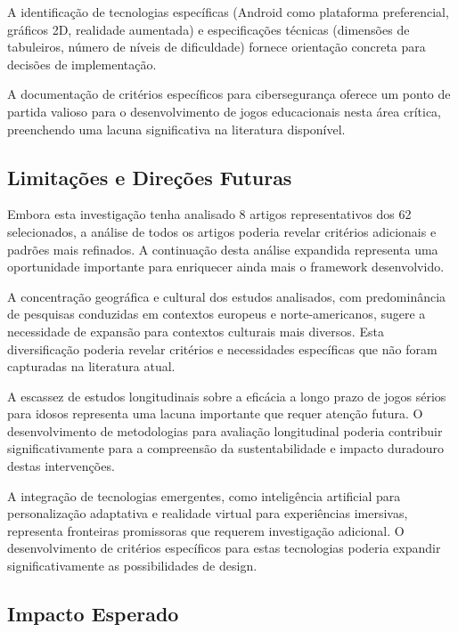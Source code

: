 \begin{table}[H]
A identificação de tecnologias específicas (Android como plataforma preferencial, gráficos 2D, realidade aumentada) e especificações técnicas (dimensões de tabuleiros, número de níveis de dificuldade) fornece orientação concreta para decisões de implementação.

A documentação de critérios específicos para cibersegurança oferece um ponto de partida valioso para o desenvolvimento de jogos educacionais nesta área crítica, preenchendo uma lacuna significativa na literatura disponível.

\subsection{Limitações e Direções Futuras}
\label{subsec:limitacoes_direções}

Embora esta investigação tenha analisado 8 artigos representativos dos 62 selecionados, a análise de todos os artigos poderia revelar critérios adicionais e padrões mais refinados. A continuação desta análise expandida representa uma oportunidade importante para enriquecer ainda mais o framework desenvolvido.

A concentração geográfica e cultural dos estudos analisados, com predominância de pesquisas conduzidas em contextos europeus e norte-americanos, sugere a necessidade de expansão para contextos culturais mais diversos. Esta diversificação poderia revelar critérios e necessidades específicas que não foram capturadas na literatura atual.

A escassez de estudos longitudinais sobre a eficácia a longo prazo de jogos sérios para idosos representa uma lacuna importante que requer atenção futura. O desenvolvimento de metodologias para avaliação longitudinal poderia contribuir significativamente para a compreensão da sustentabilidade e impacto duradouro destas intervenções.

A integração de tecnologias emergentes, como inteligência artificial para personalização adaptativa e realidade virtual para experiências imersivas, representa fronteiras promissoras que requerem investigação adicional. O desenvolvimento de critérios específicos para estas tecnologias poderia expandir significativamente as possibilidades de design.

\subsection{Impacto Esperado}
\label{subsec:impacto_esperado}


\end{table}

